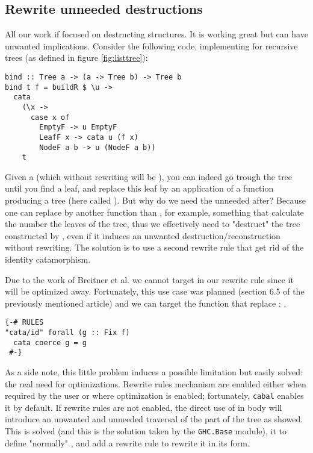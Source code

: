 \subsection{Rewrite unneeded destructions}
\label{sec:bind-def}
All our work if focused on destructing structures. It is working great but can have unwanted implications. Consider the following code, implementing  for recursive trees (as defined in figure \ref{fig:listtree}):

\begin{verbatim}
bind :: Tree a -> (a -> Tree b) -> Tree b
bind t f = buildR $ \u ->
  cata
    (\x ->
      case x of
        EmptyF -> u EmptyF
        LeafF x -> cata u (f x)
        NodeF a b -> u (NodeF a b))
    t
\end{verbatim}

\noindent Given a  (which without rewriting will be ), you can indeed go trough the tree until you find a leaf, and replace this leaf by an application of a function producing a tree (here called ). But why do we need the unneeded  after? Because one can replace  by another function than , for example, something that calculate the number the leaves of the tree, thus we effectively need to "destruct" the tree constructed by , even if it induces an unwanted destruction/reconstruction without rewriting. The solution is to use a second rewrite rule that get rid of the identity catamorphism.

Due to the work of Breitner et al. \cite{Breitner:2014:SZC:2692915.2628141} we cannot target  in our rewrite rule since it will be optimized away. Fortunately, this use case was planned (section 6.5 of the previously mentioned article) and we can target the function that replace : .

\begin{verbatim}
{-# RULES
"cata/id" forall (g :: Fix f)
  cata coerce g = g
 #-}
\end{verbatim}

\noindent As a side note, this little problem induces a possible limitation but easily solved: the real need for optimizations. Rewrite rules mechanism are enabled either when required by the user or where optimization is enabled; fortunately, \verb|cabal| enables it by default. If rewrite rules are not enabled, the direct use of  in  body will introduce an unwanted and unneeded traversal of the part of the tree as showed. This is solved (and this is the solution taken by the \verb|GHC.Base| module), it to define "normally" , and add a rewrite rule to rewrite it in its  form.

